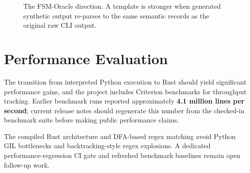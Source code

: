 \documentclass[a4paper,10pt]{article}
\begin{document}
\begin{figure}[H]
\centering
{}
\caption{The FSM-Oracle direction. A template is stronger when generated synthetic output re-parses to the same semantic records as the original raw CLI output.}
\label{fig:cs-fsm-oracle}
\end{figure}


\section{Performance Evaluation}
\label{sec:performance}

The transition from interpreted Python execution to Rust should yield significant performance gains, and the project includes Criterion benchmarks for throughput tracking. Earlier benchmark runs reported approximately \textbf{4.1 million lines per second}; current release notes should regenerate this number from the checked-in benchmark suite before making public performance claims.

The compiled Rust architecture and DFA-based regex matching avoid Python GIL bottlenecks and backtracking-style regex explosions. A dedicated performance-regression CI gate and refreshed benchmark baselines remain open follow-up work.
\end{document}
